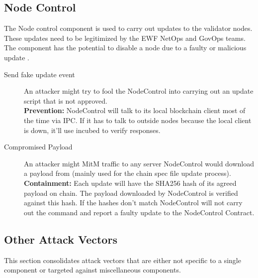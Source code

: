 \subsection{Node Control}

The Node control component is used to carry out updates to the validator nodes. These updates need to be legitimized by the EWF NetOps and GovOps teams.
The component has the potential to disable a node due to a faulty or malicious update .

\begin{description}
    \item[Send fake update event] 
        An attacker might try to fool the NodeControl into carrying out an update script that is not approved. \\
        \textbf{Prevention:} NodeControl will talk to its local blockchain client most of the time via IPC. 
        If it has to talk to outside nodes because the local client is down, it'll use incubed to verify responses.

    \item[Compromised Payload]
        An attacker might MitM traffic to any server NodeControl would download a payload from (mainly used for the chain spec file update process). \\
        \textbf{Containment:} Each update will have the SHA256 hash of its agreed payload on chain. The payload downloaded by NodeControl is verified against this hash. If the hashes don't match NodeControl will not carry out the command and report a faulty update to the NodeControl Contract.

\end{description}


\subsection{Other Attack Vectors}

This section consolidates attack vectors that are either not specific to a single component or targeted against miscellaneous components.

